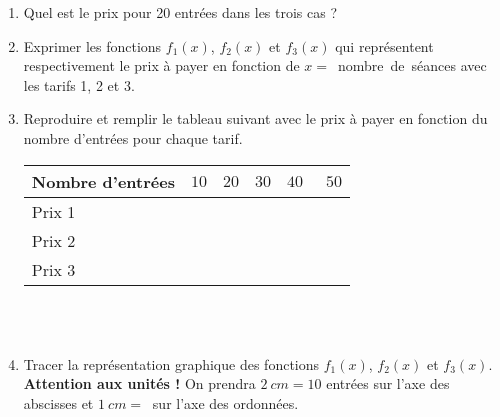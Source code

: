 \begin{enumerate}[1)~~~]
\item Quel est le prix pour 20 entrées dans les trois cas ?


\item Exprimer les fonctions $f_1(x)$, $f_2(x)$ et $f_3(x)$ qui représentent respectivement le prix à payer en fonction de \mbox{$x=$ \og nombre de séances\fg} avec les tarifs 1, 2 et 3.

%
%


\item Reproduire et remplir le tableau suivant avec le prix à payer en fonction du nombre d'entrées pour chaque tarif.
	\begin{center}
		\begin{tabular}{|>{\centering}m{100pt}|>{\centering}m{30pt}|>{\centering}m{30pt}|>{\centering}m{30pt}|>{\centering}m{30pt}|m{30pt}|}
		\hline 
		Nombre d'entrées & $10$ & $20$ & $30$ & $40$ & $~~50$ \\
		\hline
		Prix 1 	&  &   &   &   &	\\ 
		\hline 
		Prix 2 	&  &   &   &   &	\\ 
		\hline 
		Prix 3 	&  &   &   &   &	\\ 
		\hline 
		\end{tabular}~\\~\\
	\end{center}
	

\item Tracer la représentation graphique des fonctions $f_1(x)$, $f_2(x)$ et $f_3(x)$. \textbf{Attention aux unités !} On prendra $2~cm=10$ entrées sur l'axe des abscisses et $1~cm=~$ sur l'axe des ordonnées.


\end{enumerate}
